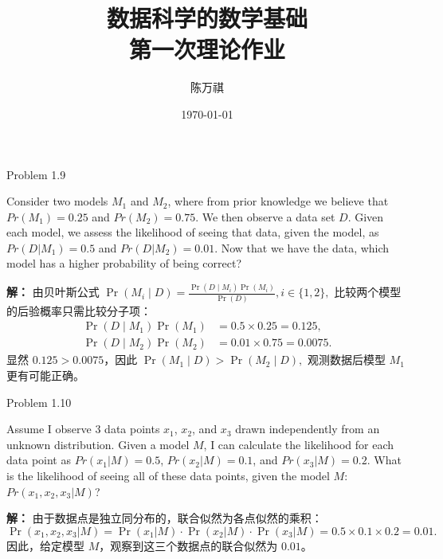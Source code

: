 \documentclass[12pt,a4paper]{article}
\title{数据科学的数学基础 \\ 第一次理论作业 }
\author{ 陈万祺 \quad 3220102895}
\date{\today}
\newenvironment{exercise}[2][]
  {\begin{exercisebox}[#1]{#2}\ignorespaces}
  {\end{exercisebox}}
\newenvironment{problem}
  {\begin{problemnobox}\ignorespaces}
  {\end{problemnobox}}
\newenvironment{solution}
  {\par\noindent\textbf{\color{SolutionColor}解：}\ignorespaces}
  {}
\begin{document}
\maketitle

\begin{exercise}{Problem 1.9}
\begin{problem}
    Consider two models \(M_1\) and \(M_2\), where from prior knowledge we believe that \(Pr(M_1) = 0.25\) and \(Pr(M_2) = 0.75\). We then observe a data set \(D\). Given each model, we assess the likelihood of seeing that data, given the model, as \(Pr(D | M_1) = 0.5\) and \(Pr(D | M_2) = 0.01\). Now that we have the data, which model has a higher probability of being correct?
\end{problem}
\begin{solution}
由贝叶斯公式
\(
\Pr(M_i\mid D)=\frac{\Pr(D\mid M_i)\Pr(M_i)}{\Pr(D)}, i\in\{1,2\},
\)
比较两个模型的后验概率只需比较分子项：
\begin{align*}
\Pr(D\mid M_1)\Pr(M_1) &= 0.5 \times 0.25 = 0.125, \\
\Pr(D\mid M_2)\Pr(M_2) &= 0.01 \times 0.75 = 0.0075.
\end{align*}
显然 \(0.125 > 0.0075\)，因此
\(
\Pr(M_1\mid D) > \Pr(M_2\mid D),
\)
观测数据后模型 \(M_1\) 更有可能正确。
\end{solution}
\end{exercise}

\begin{exercise}{Problem 1.10}
\begin{problem}
    Assume I observe 3 data points \(x_1\), \(x_2\), and \(x_3\) drawn independently from an unknown distribution. Given a model \(M\), I can calculate the likelihood for each data point as \(Pr(x_1 | M) = 0.5\), \(Pr(x_2 | M) = 0.1\), and \(Pr(x_3 | M) = 0.2\). What is the likelihood of seeing all of these data points, given the model \(M\): \(Pr(x_1, x_2, x_3 | M)\)?
\end{problem}
\begin{solution}
由于数据点是独立同分布的，联合似然为各点似然的乘积：
\[
\Pr(x_1, x_2, x_3 | M) = \Pr(x_1 | M) \cdot \Pr(x_2 | M) \cdot \Pr(x_3 | M) = 0.5 \times 0.1 \times 0.2 = 0.01.
\]
因此，给定模型 \(M\)，观察到这三个数据点的联合似然为 \(0.01\)。
\end{solution}
\end{exercise}
\end{document}
